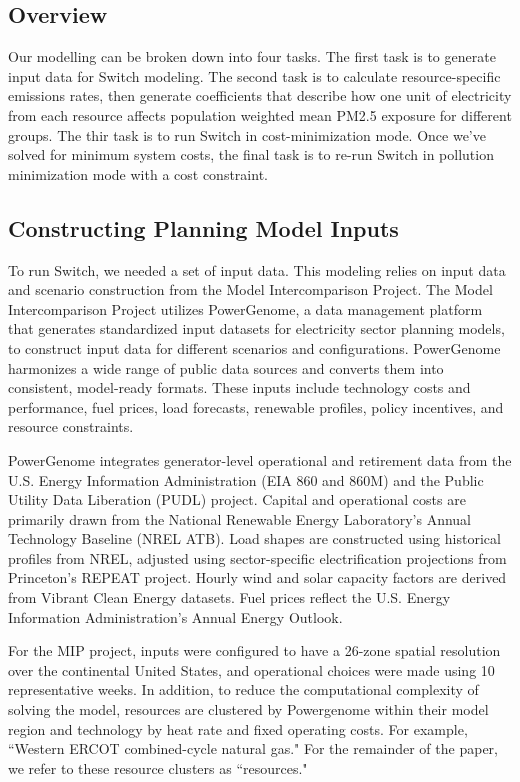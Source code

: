 \documentclass[a4paper]{article}
\theoremstyle{definition}
\theoremstyle{plain}
\begin{document}
\subsection{Overview}
Our modelling can be broken down into four tasks. The first task is to generate input data for Switch modeling. The second task is to calculate resource-specific emissions rates, then generate coefficients that describe how one unit of electricity from each resource affects population weighted mean PM2.5 exposure for different groups. The thir task is to run Switch in cost-minimization mode. Once we've solved for minimum system costs, the final task is to re-run Switch in pollution minimization mode with a cost constraint.


\subsection{Constructing Planning Model Inputs}
To run Switch, we needed a set of input data. This modeling relies on input data and scenario construction from the Model Intercomparison Project. The Model Intercomparison Project utilizes PowerGenome, a data management platform that generates standardized input datasets for electricity sector planning models, to construct input data for different scenarios and configurations. PowerGenome harmonizes a wide range of public data sources and converts them into consistent, model-ready formats. These inputs include technology costs and performance, fuel prices, load forecasts, renewable profiles, policy incentives, and resource constraints.

PowerGenome integrates generator-level operational and retirement data from the U.S. Energy Information Administration (EIA 860 and 860M) and the Public Utility Data Liberation (PUDL) project. Capital and operational costs are primarily drawn from the National Renewable Energy Laboratory's Annual Technology Baseline (NREL ATB). Load shapes are constructed using historical profiles from NREL, adjusted using sector-specific electrification projections from Princeton’s REPEAT project. Hourly wind and solar capacity factors are derived from Vibrant Clean Energy datasets. Fuel prices reflect the U.S. Energy Information Administration's Annual Energy Outlook.

For the MIP project, inputs were configured to have a 26-zone spatial resolution over the continental United States, and operational choices were made using 10 representative weeks. In addition, to reduce the computational complexity of solving the model, resources are clustered by Powergenome within their model region and technology by heat rate and fixed operating costs. For example, ``Western ERCOT combined-cycle natural gas." For the remainder of the paper, we refer to these resource clusters as ``resources."
\end{document}
